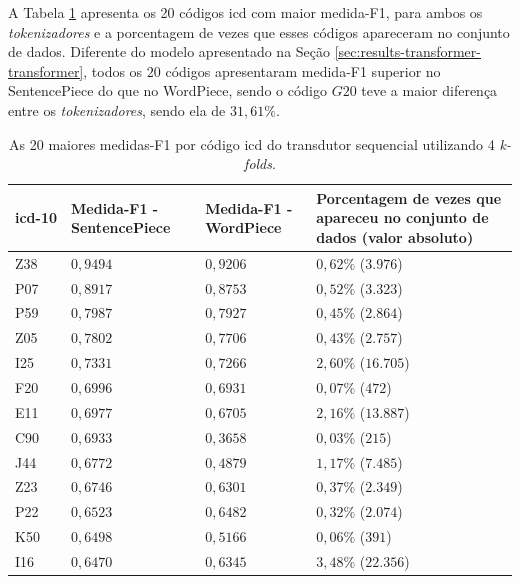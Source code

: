 A Tabela \ref{table:lstm_lstm_statistics_details} apresenta os 20 códigos \gls{icd} com maior medida-F1, para ambos os \textit{tokenizadores} e a porcentagem de vezes que esses códigos apareceram no conjunto de dados. Diferente do modelo \xfmrxfmr{} apresentado na Seção \ref{sec:results-transformer-transformer}, todos os $20$ códigos apresentaram medida-F1 superior no SentencePiece do que no WordPiece, sendo o código $G20$ teve a maior diferença entre os \textit{tokenizadores}, sendo ela de $31,61\%$.
\begin{table}[ht!]
    \caption{As 20 maiores medidas-F1 por código \gls{icd} do transdutor sequencial \lstmlstm{} utilizando 4 \textit{k-folds}.}
    \label{table:lstm_lstm_statistics_details}
    \centering
    \begin{tabular}{
        >{\centering\arraybackslash}m{} | >{\centering\arraybackslash}m{} | >{\centering\arraybackslash}m{} | >{\centering\arraybackslash}m{}}
        \hline
        \gls{icd}-10 & Medida-F1 - SentencePiece & Medida-F1 - WordPiece & Porcentagem de vezes que apareceu no conjunto de dados (valor absoluto) \\
        \hline
        Z38 & $0,9494$ & $0,9206$ & $0,62\%$ ($3.976$) \\
        \hline
        P07 & $0,8917$ & $0,8753$ & $0,52\%$ ($3.323$) \\
        \hline
        P59 & $0,7987$ & $0,7927$ & $0,45\%$ ($2.864$) \\
        \hline
        Z05 & $0,7802$ & $0,7706$ & $0,43\%$ ($2.757$) \\
        \hline
        I25 & $0,7331$ & $0,7266$ & $2,60\%$ ($16.705$) \\  
        \hline
        F20 & $0,6996$ & $0,6931$ & $0,07\%$ ($472$) \\
        \hline
        E11 & $0,6977$ & $0,6705$ & $2,16\%$ ($13.887$) \\
        \hline
        C90 & $0,6933$ & $0,3658$ & $0,03\%$ ($215$) \\ 
        \hline
        J44 & $0,6772$ & $0,4879$ & $1,17\%$ ($7.485$) \\
        \hline
        Z23 & $0,6746$ & $0,6301$ & $0,37\%$ ($2.349$) \\
        \hline
        P22 & $0,6523$ & $0,6482$ & $0,32\%$ ($2.074$) \\
        \hline
        K50 & $0,6498$ & $0,5166$ & $0,06\%$ ($391$) \\
        \hline
        I16 & $0,6470$ & $0,6345$ & $3,48\%$ ($22.356$) \\

\end{tabular}
\end{table}
